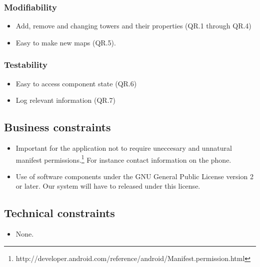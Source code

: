 \subsubsection{Modifiability}
\begin{itemize}
        \item Add, remove and changing towers and their properties (QR.1 through QR.4)
        \item Easy to make new maps (QR.5).
\end{itemize}

\subsubsection{Testability}
\begin{itemize}
        \item Easy to access component state (QR.6)
        \item Log relevant information (QR.7)
\end{itemize}

\subsection{Business constraints}
\begin{itemize}
        \item Important for the application not to require uneccesary and unnatural manifest permissions.\footnote{http://developer.android.com/reference/android/Manifest.permission.html} For instance contact information on the phone.
        \item Use of software components under the GNU General Public License version 2 or later. Our system will have to released under this license. 
\end{itemize}

\subsection{Technical constraints}
\begin{itemize}
        \item None.
\end{itemize}


